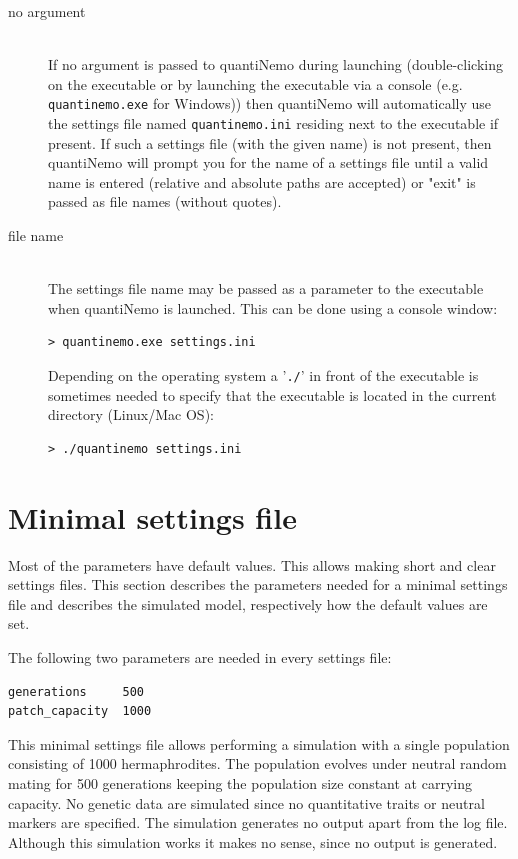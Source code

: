 \documentclass[letterpaper,12pt,oneside]{book}
\begin{document}
\begin{description}
\item[no argument]\hspace*{\fill}\\ 
If no argument is passed to quantiNemo during launching (double-clicking on the executable or by launching the executable via a console (e.g. \texttt{quantinemo.exe} for Windows)) then quantiNemo will automatically use the settings file named \texttt{quantinemo.ini} residing next to the executable if present. If such a settings file (with the given name) is not present, then quantiNemo will prompt you for the name of a settings file until a valid name is entered (relative and absolute paths are accepted) or "exit" is passed as file names (without quotes).   

\item[file name]\hspace*{\fill}\\ 
The settings file name may be passed as a parameter to the executable when quantiNemo is launched. This can be done using a console window:

\begin{lstlisting}[frame=single]
> quantinemo.exe settings.ini
\end{lstlisting}

Depending on the operating system a '\texttt{./}' in front of the executable is sometimes needed to specify that the executable is located in the current directory (Linux/Mac OS):
\begin{lstlisting}[frame=single]
> ./quantinemo settings.ini
\end{lstlisting}
\end{description}

\section{Minimal settings file}
Most of the parameters have default values. This allows making short and clear settings files. This section describes the parameters needed for a minimal settings file and describes the simulated model, respectively how the default values are set.

The following two parameters are needed in every settings file:
\begin{lstlisting}[frame=single]
generations     500
patch_capacity  1000
\end{lstlisting}

This minimal settings file allows performing a simulation with a single population consisting of 1000 hermaphrodites. The population evolves under neutral random mating for 500 generations keeping the population size constant at carrying capacity. No genetic data are simulated since no quantitative traits or neutral markers are specified. The simulation generates no output apart from the log file. Although this simulation works it makes no sense, since no output is generated. 
\end{document}
